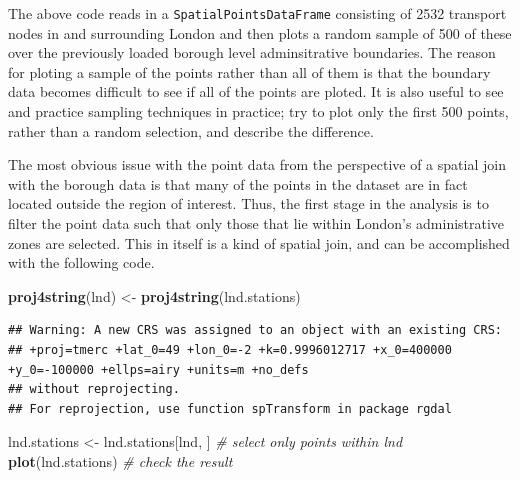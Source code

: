 \documentclass[]{article}
\newenvironment{Shaded}{}{}
\newcommand{\KeywordTok}[1]{\textcolor[rgb]{0.00,0.44,0.13}{\textbf{{#1}}}}
\newcommand{\StringTok}[1]{\textcolor[rgb]{0.25,0.44,0.63}{{#1}}}
\newcommand{\CommentTok}[1]{\textcolor[rgb]{0.38,0.63,0.69}{\textit{{#1}}}}
\newcommand{\NormalTok}[1]{{#1}}
\begin{document}
The above code reads in a \texttt{SpatialPointsDataFrame} consisting of
2532 transport nodes in and surrounding London and then plots a random
sample of 500 of these over the previously loaded borough level
adminsitrative boundaries. The reason for ploting a sample of the points
rather than all of them is that the boundary data becomes difficult to
see if all of the points are ploted. It is also useful to see and
practice sampling techniques in practice; try to plot only the first 500
points, rather than a random selection, and describe the difference.

The most obvious issue with the point data from the perspective of a
spatial join with the borough data is that many of the points in the
dataset are in fact located outside the region of interest. Thus, the
first stage in the analysis is to filter the point data such that only
those that lie within London's administrative zones are selected. This
in itself is a kind of spatial join, and can be accomplished with the
following code.

\begin{Shaded}
\begin{Highlighting}[]
\KeywordTok{proj4string}\NormalTok{(lnd) <-}\StringTok{ }\KeywordTok{proj4string}\NormalTok{(lnd.stations)}
\end{Highlighting}
\end{Shaded}

\begin{verbatim}
## Warning: A new CRS was assigned to an object with an existing CRS:
## +proj=tmerc +lat_0=49 +lon_0=-2 +k=0.9996012717 +x_0=400000 +y_0=-100000 +ellps=airy +units=m +no_defs
## without reprojecting.
## For reprojection, use function spTransform in package rgdal
\end{verbatim}

\begin{Shaded}
\begin{Highlighting}[]
\NormalTok{lnd.stations <-}\StringTok{ }\NormalTok{lnd.stations[lnd, ]  }\CommentTok{# select only points within lnd}
\KeywordTok{plot}\NormalTok{(lnd.stations)  }\CommentTok{# check the result}
\end{Highlighting}
\end{Shaded}
\end{document}
